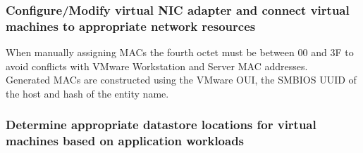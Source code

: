 \subsubsection{Configure/Modify virtual NIC adapter and connect virtual machines to appropriate network resources}

When manually assigning MACs the fourth octet must be between 00 and 3F to
avoid conflicts with VMware Workstation and Server MAC addresses.\\

Generated MACs are constructed using the VMware OUI, the SMBIOS UUID of the
host and hash of the entity name.

\subsubsection{Determine appropriate datastore locations for virtual machines based on application workloads}
